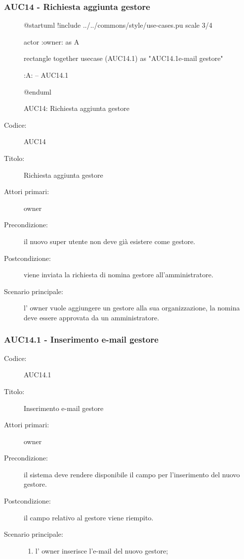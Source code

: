 \documentclass[casi-duso]{subfiles}
\begin{document}
\subsubsection{AUC14 - Richiesta aggiunta gestore}%
\label{subsub:AUC14}

\begin{figure}[h!] 
  \centering 
  \begin{plantuml}
  @startuml
  !include ../../commons/style/use-cases.pu
  scale 3/4

  actor :owner: as A

  rectangle {
    together {
      usecase (AUC14.1) as "AUC14.1\nInserimento e-mail gestore"
    }
  }

  :A: -- AUC14.1

  @enduml
  \end{plantuml} 
  \caption{AUC14: Richiesta aggiunta gestore} 
  \label{fig:auc14} 
\end{figure}

\begin{description}
  \item[Codice:] AUC14
  \item[Titolo:] Richiesta aggiunta gestore
  \item[Attori primari:] owner
  \item[Precondizione:] il nuovo super utente non deve già esistere come gestore.
  \item[Postcondizione:] viene inviata la richiesta di nomina gestore all'amministratore.
  \item[Scenario principale:] l' owner vuole aggiungere un gestore alla sua organizzazione, la nomina deve essere approvata da un 
  amministratore.
\end{description}

\subsubsection{AUC14.1 - Inserimento e-mail gestore}%
\label{subsub:AUC14.1}
\begin{description}
  \item[Codice:] AUC14.1
  \item[Titolo:] Inserimento e-mail gestore
  \item[Attori primari:] owner
  \item[Precondizione:] il sistema deve rendere disponibile il campo per l'inserimento del nuovo gestore.
  \item[Postcondizione:] il campo relativo al gestore viene riempito.
  \item[Scenario principale:] 
  \begin{enumerate}
    \item l' owner inserisce l'e-mail del nuovo gestore;
  \end{enumerate}
\end{description}

\end{document}
